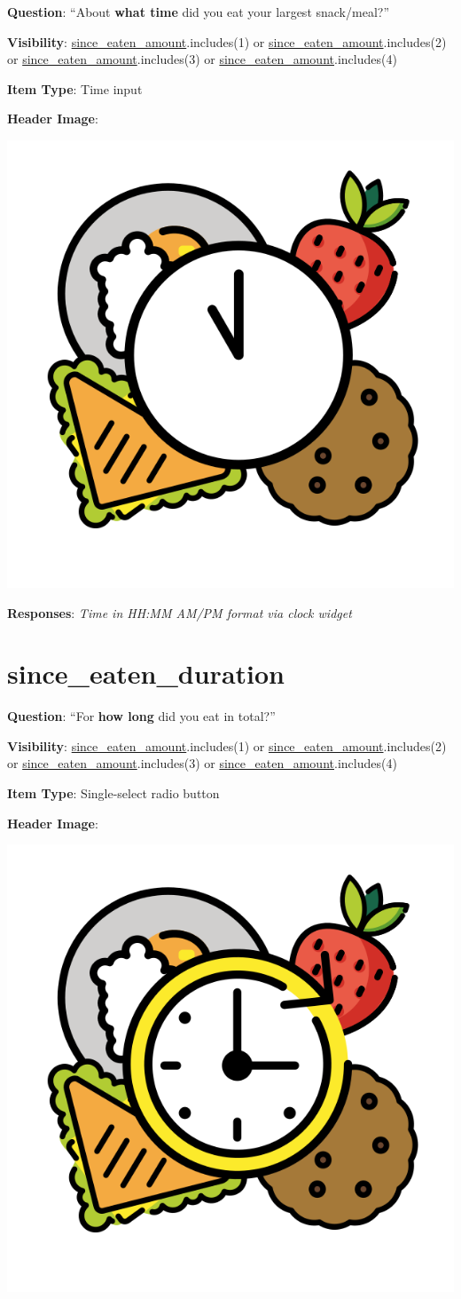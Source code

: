 \documentclass[]{book}
\begin{document}
\textbf{Question}: ``About \textbf{what time} did you eat your largest snack/meal?''

\textbf{Visibility}: \protect\hyperlink{since_eaten_amount}{since\_eaten\_amount}.includes(1) or \protect\hyperlink{since_eaten_amount}{since\_eaten\_amount}.includes(2) or \protect\hyperlink{since_eaten_amount}{since\_eaten\_amount}.includes(3) or \protect\hyperlink{since_eaten_amount}{since\_eaten\_amount}.includes(4)

\textbf{Item Type}: Time input

\textbf{Header Image}:

\begin{flushleft}\includegraphics[width=0.33\linewidth]{downloadFigs4latex_NIMH_Applet_Codebook/since_eaten_when_headerImg} \end{flushleft}

\textbf{Responses}: \emph{Time in HH:MM AM/PM format via clock widget}

\hypertarget{since_eaten_duration}{%
\section{since\_eaten\_duration}\label{since_eaten_duration}}

\textbf{Question}: ``For \textbf{how long} did you eat in total?''

\textbf{Visibility}: \protect\hyperlink{since_eaten_amount}{since\_eaten\_amount}.includes(1) or \protect\hyperlink{since_eaten_amount}{since\_eaten\_amount}.includes(2) or \protect\hyperlink{since_eaten_amount}{since\_eaten\_amount}.includes(3) or \protect\hyperlink{since_eaten_amount}{since\_eaten\_amount}.includes(4)

\textbf{Item Type}: Single-select radio button

\textbf{Header Image}:

\begin{flushleft}\includegraphics[width=0.33\linewidth]{downloadFigs4latex_NIMH_Applet_Codebook/since_eaten_duration_headerImg} \end{flushleft}
\end{document}

